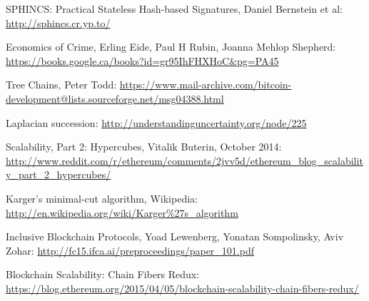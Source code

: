 \documentclass[11pt,a4paper]{report}
\theoremstyle{plain}
\theoremstyle{definition}
\theoremstyle{remark}
\begin{document}
\begin{thebibliography}{32}
    SPHINCS: Practical Stateless Hash-based Signatures, Daniel Bernstein et al: \url{http://sphincs.cr.yp.to/}

    Economics of Crime, Erling Eide, Paul H Rubin, Joanna Mehlop Shepherd: \url{https://books.google.ca/books?id=gr95IhFHXHoC&pg=PA45}

    Tree Chains, Peter Todd: \url{https://www.mail-archive.com/bitcoin-development@lists.sourceforge.net/msg04388.html}

    Laplacian succession: \url{http://understandinguncertainty.org/node/225}

    Scalability, Part 2: Hypercubes, Vitalik Buterin, October 2014: \url{http://www.reddit.com/r/ethereum/comments/2jvv5d/ethereum_blog_scalability_part_2_hypercubes/}

    Karger's minimal-cut algorithm, Wikipedia: \url{http://en.wikipedia.org/wiki/Karger%27s_algorithm}

    Inclusive Blockchain Protocols, Yoad Lewenberg, Yonatan Sompolinsky, Aviv Zohar: \url{http://fc15.ifca.ai/preproceedings/paper_101.pdf}

    Blockchain Scalability: Chain Fibers Redux: \url{https://blog.ethereum.org/2015/04/05/blockchain-scalability-chain-fibers-redux/}

\end{thebibliography}
\end{document}
